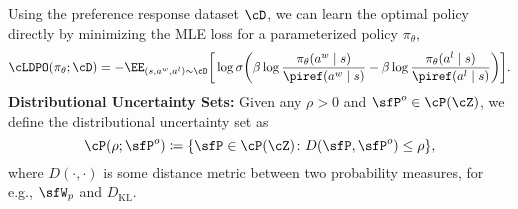 Using the preference response dataset $\cD$, we can learn the optimal policy directly by minimizing the  MLE loss for a parameterized policy $\pi_\theta$, 
\begin{align}\label{eq:dpo-loss-dataset}
    \cLDPO(\pi_\theta;\cD)=-\EE_{(s,a^w,a^l)\sim\cD} \bigg[   \log\sigma\bigg( \beta\log\frac{\pi_\theta(a^w\mid s)}{\piref(a^w\mid s)} - \beta \log\frac{\pi_\theta(a^l\mid s)}{\piref(a^l\mid s)}\bigg)\bigg].
\end{align}
\textbf{Distributional Uncertainty Sets:} Given any $\rho>0$ and $\sfP^o\in\cP(\cZ)$, we define the distributional uncertainty set as
\begin{equation}\label{eq:generic-uncertainty-set}
    \cP(\rho;\sfP^o) \coloneqq \{\sfP\in\cP(\cZ)\colon D(\sfP,\sfP^o)\leq \rho\},
\end{equation}
where $D(\cdot,\cdot)$ is some distance metric between two probability measures, for e.g., $\sfW_p$ and $D_{\mathrm{KL}}$. 
